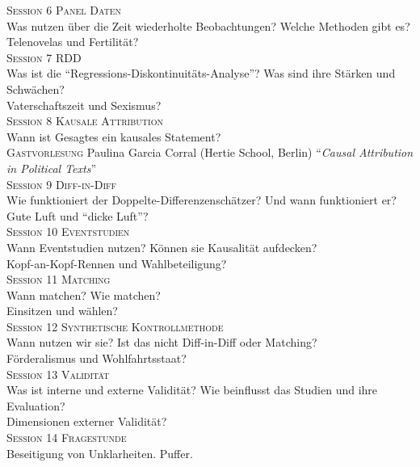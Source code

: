 \documentclass[12pt,a4paper]{article}
\begin{document}
\textsc{Session 6 \dotfill Panel Daten}  \\
{\color{darkgreen}{\Rectangle}} Was nutzen über die Zeit wiederholte Beobachtungen? Welche Methoden gibt es?\\
{\color{darkgreen}{\Rectangle}} Telenovelas und Fertilität? 
\medskip  \\	
\textsc{Session 7 \dotfill RDD}  \\
{\color{darkgreen}{\Rectangle}} Was ist die ``Regressions-Diskontinuitäts-Analyse''? Was sind ihre Stärken und Schwächen?\\
{\color{darkgreen}{\Rectangle}} Vaterschaftszeit und Sexismus? 
\medskip  \\	
\textsc{Session 8 \dotfill Kausale Attribution}  \\
{\color{darkgreen}{\Rectangle}} Wann ist Gesagtes ein kausales Statement? \\  
{\color{darkgreen}{\Rectangle}} \textsc{Gastvorlesung} Paulina Garcia Corral (Hertie School, Berlin) ``\textit{Causal Attribution in Political Texts}'' \medskip  \\	
\textsc{Session 9 \dotfill Diff-in-Diff}  \\
{\color{darkgreen}{\Rectangle}} Wie funktioniert der Doppelte-Differenzenschätzer? Und wann funktioniert er?\\
{\color{darkgreen}{\Rectangle}} Gute Luft und ``dicke Luft''? 
\medskip  \\	
\textsc{Session 10 \dotfill Eventstudien} \\
{\color{darkgreen}{\Rectangle}} Wann Eventstudien nutzen? Können sie Kausalität aufdecken? \\
{\color{darkgreen}{\Rectangle}} Kopf-an-Kopf-Rennen und Wahlbeteiligung? 
\medskip  \\
\textsc{Session 11 \dotfill Matching}  \\
{\color{darkgreen}{\Rectangle}} Wann matchen? Wie matchen?\\
{\color{darkgreen}{\Rectangle}} Einsitzen und wählen? 
\medskip  \\	
\textsc{Session 12 \dotfill Synthetische Kontrollmethode}  \\
{\color{darkgreen}{\Rectangle}} Wann nutzen wir sie? Ist das nicht Diff-in-Diff oder Matching? \\
{\color{darkgreen}{\Rectangle}} Förderalismus und Wohlfahrtsstaat?  \medskip  \\
\textsc{Session 13 \dotfill Validität}  \\
{\color{darkgreen}{\Rectangle}} Was ist interne und externe Validität? Wie beinflusst das Studien und ihre Evaluation? \\
{\color{darkgreen}{\Rectangle}} Dimensionen externer Validität? 
 \medskip  \\	
\textsc{Session 14 \dotfill Fragestunde}  \\
{\color{darkgreen}{\Rectangle}} Beseitigung von Unklarheiten. Puffer.  \medskip  \\	
	
\end{document}
